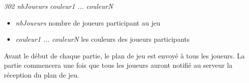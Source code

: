 \par

\textit{302 nbJoueurs {couleur1 ... couleurN}}

\begin{itemize}

	\item \textit{nbJoueurs} 	\tabto{4cm} nombre de joueurs participant au jeu 
	
	\item \textit{couleur1 ... couleurN} 	\tabto{4cm} les couleurs des joueurs participants\\
 
\end{itemize} 

Avant le début de chaque partie, le plan de jeu est envoyé à tous les joueurs. La partie commencera une fois que tous les joueurs auront notifié au serveur la réception du plan de jeu. \\
